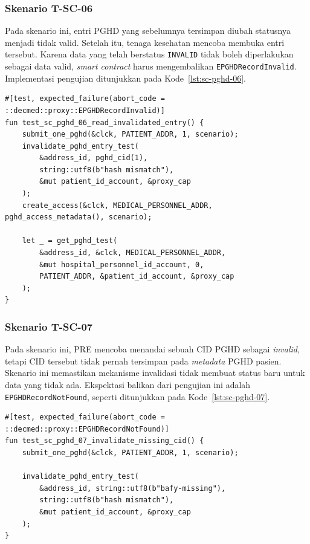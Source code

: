 \subsubsection{Skenario T-SC-06}

Pada skenario ini, entri PGHD yang sebelumnya tersimpan diubah statusnya menjadi tidak valid.
Setelah itu, tenaga kesehatan mencoba membuka entri tersebut.
Karena data yang telah berstatus \texttt{INVALID} tidak boleh diperlakukan sebagai data valid, \textit{smart contract} harus mengembalikan \texttt{EPGHDRecordInvalid}.
Implementasi pengujian ditunjukkan pada Kode~\ref{lst:sc-pghd-06}.

\begin{lstlisting}[caption={Pengujian buka entri PGHD yang sudah invalid}, label={lst:sc-pghd-06}, float=htb]
#[test, expected_failure(abort_code = ::decmed::proxy::EPGHDRecordInvalid)]
fun test_sc_pghd_06_read_invalidated_entry() {
    submit_one_pghd(&clck, PATIENT_ADDR, 1, scenario);
    invalidate_pghd_entry_test(
        &address_id, pghd_cid(1),
        string::utf8(b"hash mismatch"),
        &mut patient_id_account, &proxy_cap
    );
    create_access(&clck, MEDICAL_PERSONNEL_ADDR, pghd_access_metadata(), scenario);

    let _ = get_pghd_test(
        &address_id, &clck, MEDICAL_PERSONNEL_ADDR,
        &mut hospital_personnel_id_account, 0,
        PATIENT_ADDR, &patient_id_account, &proxy_cap
    );
}
\end{lstlisting}

\subsubsection{Skenario T-SC-07}

Pada skenario ini, PRE mencoba menandai sebuah CID PGHD sebagai \textit{invalid}, tetapi CID tersebut tidak pernah tersimpan pada \textit{metadata} PGHD pasien.
Skenario ini memastikan mekanisme invalidasi tidak membuat status baru untuk data yang tidak ada.
Ekspektasi balikan dari pengujian ini adalah \texttt{EPGHDRecordNotFound}, seperti ditunjukkan pada Kode~\ref{lst:sc-pghd-07}.

\begin{lstlisting}[caption={Pengujian invalidasi CID PGHD yang tidak ditemukan}, label={lst:sc-pghd-07}, float=htb]
#[test, expected_failure(abort_code = ::decmed::proxy::EPGHDRecordNotFound)]
fun test_sc_pghd_07_invalidate_missing_cid() {
    submit_one_pghd(&clck, PATIENT_ADDR, 1, scenario);

    invalidate_pghd_entry_test(
        &address_id, string::utf8(b"bafy-missing"),
        string::utf8(b"hash mismatch"),
        &mut patient_id_account, &proxy_cap
    );
}
\end{lstlisting}

